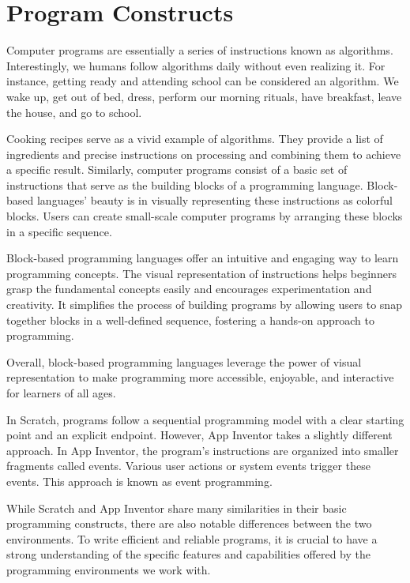 \chapter{Program Constructs}

Computer programs are essentially a series of instructions known as algorithms. Interestingly, we humans follow algorithms daily without even realizing it. For instance, getting ready and attending school can be considered an algorithm. We wake up, get out of bed, dress, perform our morning rituals, have breakfast, leave the house, and go to school. 

Cooking recipes serve as a vivid example of algorithms. They provide a list of ingredients and precise instructions on processing and combining them to achieve a specific result. Similarly, computer programs consist of a basic set of instructions that serve as the building blocks of a programming language. Block-based languages' beauty is in visually representing these instructions as colorful blocks. Users can create small-scale computer programs by arranging these blocks in a specific sequence.

Block-based programming languages offer an intuitive and engaging way to learn programming concepts. The visual representation of instructions helps beginners grasp the fundamental concepts easily and encourages experimentation and creativity. It simplifies the process of building programs by allowing users to snap together blocks in a well-defined sequence, fostering a hands-on approach to programming.

Overall, block-based programming languages leverage the power of visual representation to make programming more accessible, enjoyable, and interactive for learners of all ages.

In Scratch, programs follow a sequential programming model with a clear starting point and an explicit endpoint. However, App Inventor takes a slightly different approach. In App Inventor, the program's instructions are organized into smaller fragments called events. Various user actions or system events trigger these events. This approach is known as event programming.

While Scratch and App Inventor share many similarities in their basic programming constructs, there are also notable differences between the two environments. To write efficient and reliable programs, it is crucial to have a strong understanding of the specific features and capabilities offered by the programming environments we work with.


